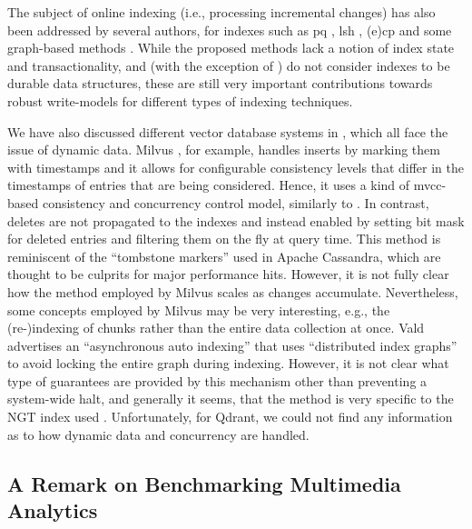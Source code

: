 The subject of online indexing (i.e., processing incremental changes) has also been addressed by several authors, for indexes such as \acrshort{pq} \cite{Xu:2018Online}, \acrshort{lsh} \cite{Cakir:2015Adaptive}, (e)\acrshort{cp} \cite{Hojsgaard:2019Index} and some graph-based methods \cite{Zhao:2022Approximate}. While the proposed methods lack a notion of index state and transactionality, and (with the exception of \cite{Hojsgaard:2019Index}) do not consider indexes to be durable data structures, these are still very important contributions towards robust write-models for different types of indexing techniques. 

We have also discussed different vector database systems in , which all face the issue of dynamic data. Milvus \cite{Wang:2021Milvus}, for example, handles inserts by marking them with timestamps and it allows for configurable consistency levels that differ in the timestamps of entries that are being considered. Hence, it uses a kind of \acrshort{mvcc}-based consistency and concurrency control model, similarly to \cottontail. In contrast, deletes are not propagated to the indexes and instead enabled by setting bit mask for deleted entries and filtering them on the fly at query time. This method is reminiscent of the ``tombstone markers'' used in Apache Cassandra, which are thought to be culprits for major performance hits. However, it is not fully clear how the method employed by Milvus scales as changes accumulate. Nevertheless, some concepts employed by Milvus may be very interesting, e.g., the (re-)indexing of chunks rather than the entire data collection at once. Vald  advertises an ``asynchronous auto indexing'' that uses ``distributed index graphs'' to avoid locking the entire graph during indexing. However, it is not clear what type of guarantees are provided by this mechanism other than preventing a system-wide halt, and generally it seems, that the method is very specific to the NGT index used \cite{Iwasaki2016:Pruned}. Unfortunately, for Qdrant, we could not find any information as to how dynamic data and concurrency are handled.

\subsection{A Remark on Benchmarking Multimedia Analytics}

